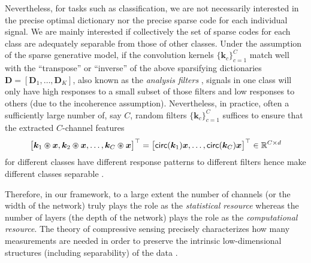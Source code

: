 \documentclass[../../book-main.tex]{subfiles}
\begin{document}
Nevertheless, for tasks such as classification, we are not necessarily interested in the precise optimal dictionary nor the precise sparse code for each individual signal. We are mainly interested if collectively the set of sparse codes for each class are adequately separable from those of other classes. Under the assumption of the sparse generative model, if the convolution kernels $\{\bm k_c\}_{c=1}^C$  match well with the ``transpose'' or ``inverse'' of the above sparsifying dictionaries $\bm D = [\bm D_1, \ldots, \bm D_K]$, also known as the {\em analysis filters} \cite{Cosparse-Nam,Analysis-Filter}, signals in one class will only have high responses to a small subset of those filters and low responses to others (due to the incoherence assumption).  Nevertheless, in practice, often a sufficiently large number of, say $C$, random filters $\{\bm k_c\}_{c=1}^C$ suffices to ensure that the extracted $C$-channel features
\begin{equation}
\big[\bm k_1 \circledast \bm{x}, \bm k_2 \circledast \bm{x}, \ldots, \bm k_C \circledast \bm{x}\big]^\top = \big[\mathsf{circ}(\bm k_1) \bm{x}, \ldots, \mathsf{circ}(\bm k_C) \bm{x} \big]^\top \in \mathbb{R}^{C\times d}
\end{equation}
for different classes have different response patterns to different filters hence make different classes separable \cite{chan2015pcanet}. 

Therefore, in our framework, to a large extent the number of channels (or the width of the network) truly plays the role as the  {\em statistical resource} whereas the number of layers (the depth of the network) plays the role as the {\em computational resource}. The theory of compressive sensing precisely characterizes how many measurements are needed in order to preserve the intrinsic low-dimensional structures (including separability) of the data \cite{Wright-Ma-2021}. %
\end{document}
